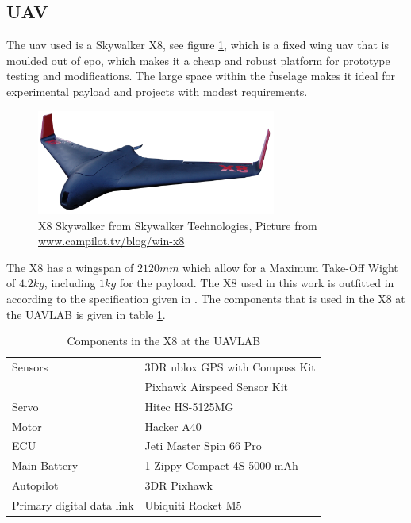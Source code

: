 \subsection{UAV}\label{ss:SkywalkerX8}
The \gls{uav} used is a Skywalker X8, see figure \ref{figure:skywalkerX8}, which is a fixed wing \acrfull{uav} that is moulded out of \gls{epo}, which makes it a cheap and robust platform for prototype testing and modifications. The large space within the fuselage makes it ideal for experimental payload and projects with modest requirements.
\begin{figure}[H]
	\centering
		\includegraphics[width=0.7\textwidth]{figs/Wing-X8_white-bgd2.png}
		\caption{X8 Skywalker from Skywalker Technologies, Picture from \url{www.campilot.tv/blog/win-x8}}
		\label{figure:skywalkerX8}
\end{figure}
The X8 has a wingspan of $2120mm$ which allow for a Maximum Take-Off Wight of $4.2kg$, including $1kg$ for the payload. The X8 used in this work is outfitted in according to the specification given in \citep{KlausenX8}. The components that is used in the X8 at the UAVLAB is given in table \ref{tb:X8Components}.
\begin{table}[H]
\begin{center}
\begin{tabular}{l l}
Sensors & 3DR ublox GPS with Compass Kit\\&Pixhawk Airspeed Sensor Kit \\
Servo & Hitec HS-5125MG \\
Motor & Hacker A40 \\
ECU & Jeti Master Spin 66 Pro \\
Main Battery & 1 Zippy Compact 4S 5000 mAh\\
Autopilot & 3DR Pixhawk \\
Primary digital data link & Ubiquiti Rocket M5
\end{tabular}
\end{center}
\caption{Components in the X8 at the UAVLAB}
\label{tb:X8Components}
\end{table}
